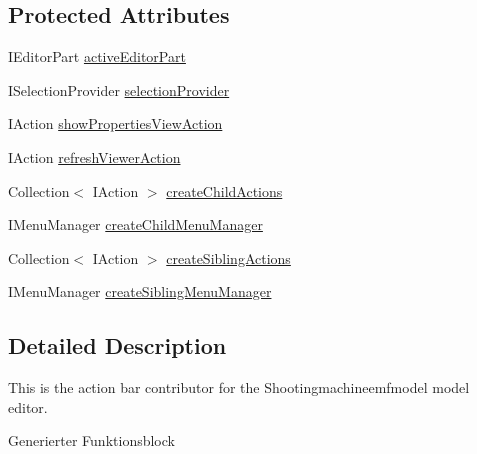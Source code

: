 \subsection*{Protected Attributes}
\begin{DoxyCompactItemize}
\item 
I\-Editor\-Part \hyperlink{classshootingmachineemfmodel_1_1presentation_1_1_shootingmachineemfmodel_action_bar_contributor_aa8d7df0f5b01cd15b5cf8b42bd84ea41}{active\-Editor\-Part}
\item 
I\-Selection\-Provider \hyperlink{classshootingmachineemfmodel_1_1presentation_1_1_shootingmachineemfmodel_action_bar_contributor_a0c7245bf969af3a5de0873e558a6c9dd}{selection\-Provider}
\item 
I\-Action \hyperlink{classshootingmachineemfmodel_1_1presentation_1_1_shootingmachineemfmodel_action_bar_contributor_ad15b135c1fbf377999142897559c8f80}{show\-Properties\-View\-Action}
\item 
I\-Action \hyperlink{classshootingmachineemfmodel_1_1presentation_1_1_shootingmachineemfmodel_action_bar_contributor_a81a2ce3c0bbe7aa402f5ef279d6d5bf0}{refresh\-Viewer\-Action}
\item 
Collection$<$ I\-Action $>$ \hyperlink{classshootingmachineemfmodel_1_1presentation_1_1_shootingmachineemfmodel_action_bar_contributor_a20d4d7f73085c23ce49651155d8ad82e}{create\-Child\-Actions}
\item 
I\-Menu\-Manager \hyperlink{classshootingmachineemfmodel_1_1presentation_1_1_shootingmachineemfmodel_action_bar_contributor_a0bd99b1414919a6ef97962b8ef4218a9}{create\-Child\-Menu\-Manager}
\item 
Collection$<$ I\-Action $>$ \hyperlink{classshootingmachineemfmodel_1_1presentation_1_1_shootingmachineemfmodel_action_bar_contributor_ae5ca03f06af30783c510f992b876c321}{create\-Sibling\-Actions}
\item 
I\-Menu\-Manager \hyperlink{classshootingmachineemfmodel_1_1presentation_1_1_shootingmachineemfmodel_action_bar_contributor_aee6eb2c90657fd95075944eab92bd344}{create\-Sibling\-Menu\-Manager}
\end{DoxyCompactItemize}


\subsection{Detailed Description}
This is the action bar contributor for the Shootingmachineemfmodel model editor.

Generierter Funktionsblock 

